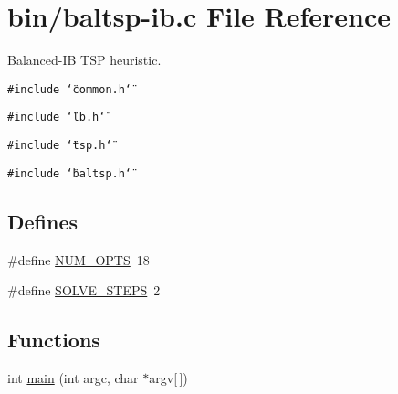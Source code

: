 \hypertarget{bin_2baltsp-ib_8c}{
\section{bin/baltsp-ib.c File Reference}
\label{bin_2baltsp-ib_8c}
}
Balanced-IB TSP heuristic.  


{\tt \#include \char`\"{}common.h\char`\"{}}\par
{\tt \#include \char`\"{}lb.h\char`\"{}}\par
{\tt \#include \char`\"{}tsp.h\char`\"{}}\par
{\tt \#include \char`\"{}baltsp.h\char`\"{}}\par
\subsection*{Defines}
\begin{CompactItemize}
\item 
\#define \hyperlink{bin_2baltsp-ib_8c_9b58b2c4af931c8486a986c9deca40f5}{NUM\_\-OPTS}~18
\item 
\#define \hyperlink{bin_2baltsp-ib_8c_ceebcce8f411269df7b99e78247d7497}{SOLVE\_\-STEPS}~2
\end{CompactItemize}
\subsection*{Functions}
\begin{CompactItemize}
\item 
int \hyperlink{bin_2baltsp-ib_8c_0ddf1224851353fc92bfbff6f499fa97}{main} (int argc, char $\ast$argv\mbox{[}$\,$\mbox{]})
\end{CompactItemize}
